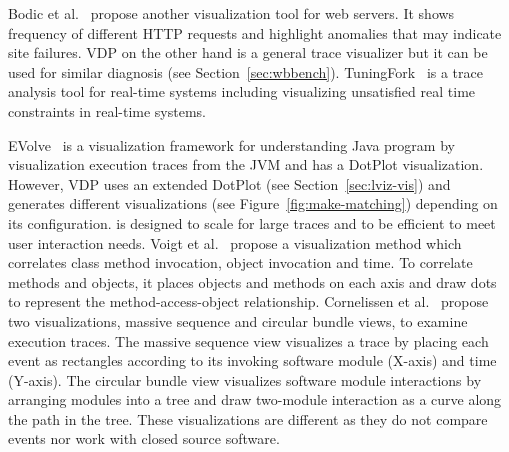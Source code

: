 Bodic et al.~\cite{bodik2005combining} propose another visualization tool for
web servers.
It shows frequency of different HTTP requests
and highlight anomalies that may indicate site failures.
VDP on the other hand is a general trace visualizer but
it can be used for similar diagnosis (see Section~\ref{sec:wbbench}).
TuningFork~\cite{bacon2007tuningfork} is a trace analysis tool for real-time
systems including visualizing unsatisfied real time constraints in real-time
systems.

EVolve~\cite{wang2003evolve} is a visualization framework for understanding
Java program by visualization execution traces from the JVM and
has a DotPlot visualization.
However, VDP uses an extended DotPlot (see Section~\ref{sec:lviz-vis})
and generates different visualizations (see Figure~\ref{fig:make-matching})
depending on its configuration.
 is designed to scale for large traces and
to be efficient to meet user interaction needs.
Voigt et al.~\cite{voigt2009object} propose a visualization method which correlates
class method invocation, object invocation and time.
To correlate methods and objects, it places objects and methods
on each axis and draw dots to represent the
method-access-object relationship.
Cornelissen et al.~\cite{cornelissen2007understanding} propose two visualizations,
massive sequence and circular bundle views, to examine execution traces.
The massive sequence view visualizes a trace by placing each event as rectangles
according to its invoking software module (X-axis) and time (Y-axis).
The circular bundle view visualizes software module interactions by arranging
modules into a tree and draw two-module interaction as a curve along the
path in the tree.
These visualizations are different as they do not compare events 
nor work with closed source software.

